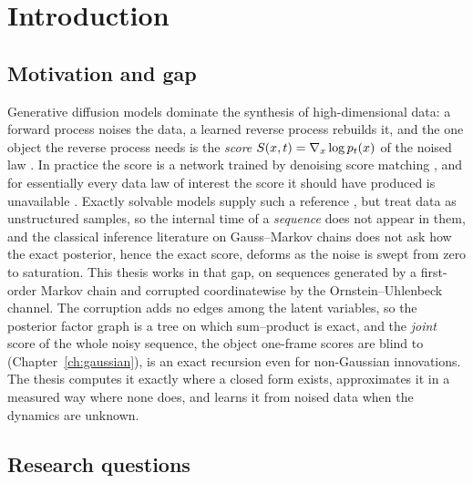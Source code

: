 \chapter{Introduction}\label{ch:intro}

\section{Motivation and gap}

Generative diffusion models \citep{sohl2015deep, ho2020denoising,
song2021scorebased} dominate the synthesis of high-dimensional data: a
forward process noises the data, a learned reverse process rebuilds it, and
the one object
the reverse process needs is the \emph{score}
$S(x,t) = \nabla_x \log p_t(x)$ of the noised law
\citep{anderson1982reverse}. In practice the score is a network trained by
denoising score matching \citep{vincent2011connection}, and for essentially
every data law of interest the score it should have produced is unavailable
\citep{kadkhodaie2024generalization}. Exactly solvable models supply such a
reference \citep{biroli2023generative, biroli2024dynamical}, but treat data
as unstructured samples, so the internal time of a \emph{sequence} does not
appear in them, and the classical inference literature on Gauss--Markov chains
\citep{kalman1960new, mezard2009information} does not ask how the exact
posterior, hence the exact score, deforms as the noise is swept from zero to
saturation. This thesis works in that gap, on sequences generated by a
first-order Markov chain and corrupted coordinatewise by the
Ornstein--Uhlenbeck channel. The corruption adds no edges among the latent
variables, so the posterior factor graph is a tree on which sum--product is
exact, and the \emph{joint} score of the whole noisy sequence, the object
one-frame scores are blind to (Chapter~\ref{ch:gaussian}), is an exact
recursion even for non-Gaussian innovations. The thesis computes it exactly
where a closed form exists, approximates it in a measured way where none
does, and learns it from noised data when the dynamics are unknown.

\section{Research questions}\label{sec:rq}

